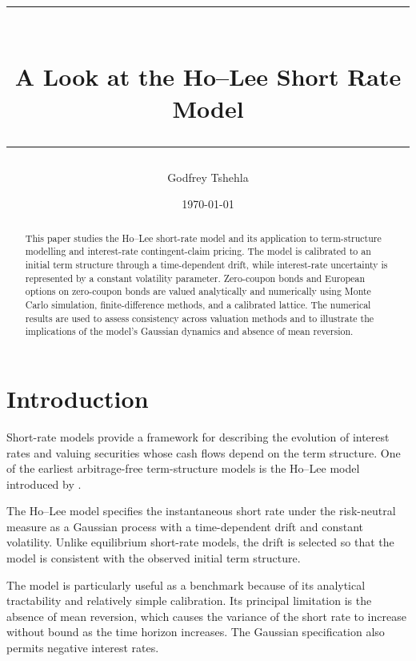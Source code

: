 \documentclass[11pt,a4paper]{article}
\title{
    \vspace{-1.5cm}
    {\color{sectionblue}\rule{\textwidth}{1.2pt}}\\[0.6cm]
    \Huge\bfseries
    A Look at the Ho--Lee Short Rate Model\\[0.6cm]
    {\color{ruleblue}\rule{\textwidth}{0.6pt}}
}
\author{
    \large Godfrey Tshehla
}
\date{\today}
\numberwithin{equation}{section}
\begin{document}
\maketitle

\vspace{-0.5cm}

\begin{abstract}
\noindent
This paper studies the Ho--Lee short-rate model and its application to
term-structure modelling and interest-rate contingent-claim pricing.
The model is calibrated to an initial term structure through a
time-dependent drift, while interest-rate uncertainty is represented by
a constant volatility parameter. Zero-coupon bonds and European options
on zero-coupon bonds are valued analytically and numerically using Monte
Carlo simulation, finite-difference methods, and a calibrated lattice.
The numerical results are used to assess consistency across valuation
methods and to illustrate the implications of the model's Gaussian
dynamics and absence of mean reversion.
\end{abstract}


\section{Introduction}

Short-rate models provide a framework for describing the evolution of
interest rates and valuing securities whose cash flows depend on the term
structure. One of the earliest arbitrage-free term-structure models is
the Ho--Lee model introduced by \citet{HoLee1986}.

The Ho--Lee model specifies the instantaneous short rate under the
risk-neutral measure as a Gaussian process with a time-dependent drift
and constant volatility. Unlike equilibrium short-rate models, the drift
is selected so that the model is consistent with the observed initial
term structure.

The model is particularly useful as a benchmark because of its analytical
tractability and relatively simple calibration. Its principal limitation
is the absence of mean reversion, which causes the variance of the short
rate to increase without bound as the time horizon increases. The
Gaussian specification also permits negative interest rates.
\end{document}

